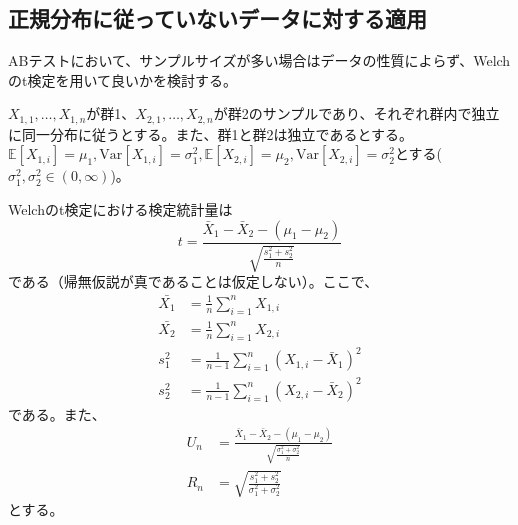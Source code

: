 \subsection{正規分布に従っていないデータに対する適用}

ABテストにおいて、サンプルサイズが多い場合はデータの性質によらず、Welchのt検定を用いて良いかを検討する。

$X_{1, 1}, \ldots, X_{1, n}$が群1、$X_{2, 1}, \ldots, X_{2, n}$が群2のサンプルであり、それぞれ群内で独立に同一分布に従うとする。また、群1と群2は独立であるとする。$\mathbb{E}[X_{1, i}] = \mu_1, \text{Var}[X_{1, i}] = \sigma^2_1, \mathbb{E}[X_{2, i}] = \mu_2, \text{Var}[X_{2, i}] = \sigma^2_2$とする($\sigma_{1}^{2}, \sigma_{2}^{2} \in (0, \infty)$)。

Welchのt検定における検定統計量は
\begin{equation}
    t = \frac{\bar{X}_1 - \bar{X}_2 - (\mu_1 - \mu_2)}{\sqrt{\frac{s_{1}^{2} + s_{2}^{2}}{n}}}
\end{equation}
である（帰無仮説が真であることは仮定しない）。ここで、
\begin{align}
    \bar{X_{1}} & = \frac{1}{n} \sum_{i = 1}^{n} X_{1, i}                         \\
    \bar{X_{2}} & = \frac{1}{n} \sum_{i = 1}^{n} X_{2, i}                         \\
    s_{1}^{2}   & = \frac{1}{n - 1} \sum_{i = 1}^{n} (X_{1, i} - \bar{X}_{1})^{2} \\
    s_{2}^{2}   & = \frac{1}{n - 1} \sum_{i = 1}^{n} (X_{2, i} - \bar{X}_{2})^{2}
\end{align}
である。また、
\begin{align}
    U_{n} & = \frac{\bar{X}_1 - \bar{X}_2 - (\mu_1 - \mu_2)}{\sqrt{\frac{\sigma_{1}^{2} + \sigma_{2}^{2}}{n}}} \\
    R_{n} & = \sqrt{\frac{s_{1}^{2} + s_{2}^{2}}{\sigma_{1}^{2} + \sigma_{2}^{2}}}
\end{align}
とする。

